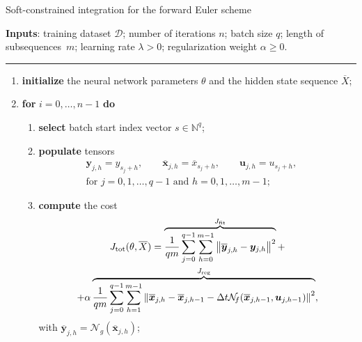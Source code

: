 \documentclass{article} %
\newcommand{\NN}{\mathcal{N}} %
\newcommand{\batchsize}{q}
\newcommand{\seqlen}{m}
\newcommand{\numiter}{n}
\newcommand{\tens}[1]{\bm{#1}}
\newcommand{\Yid}{Y}
\newcommand{\Did}{{\mathcal{D}}}
\newcommand{\hidden}[1]{\overline{#1}}
\newcommand{\norm}[1]{\left\lVert#1\right\rVert}
\renewcommand{\theenumi}{\arabic{enumi}}
\renewcommand{\theenumii}{\arabic{enumii}}
\begin{document}
\begin{algorithm}%
	\caption{Soft-constrained integration  for the forward Euler scheme}
	\label{algo:minibatch_consistency_method}
\small
	\textbf{Inputs}: training dataset $\Did$; number of iterations $n$; batch size $\batchsize$; length of subsequences~$\seqlen$; learning rate $\lambda>0$;  regularization weight $\alpha \geq 0$.
\vspace*{-.0cm}\hrule\vspace*{.0cm}
	\begin{enumerate}[label=\arabic*., ref=\theenumi{}]
        \item  \textbf{initialize} the neural network parameters $\theta$    and the hidden state sequence $\hidden{X}$; %
		\item  \textbf{for} $i=0,\ldots,\numiter-1$ \textbf{do}
		\begin{enumerate}[label=\theenumi{}.\arabic*., ref=\theenumi{}.\theenumii{}]
			\item \textbf{select} batch start index  vector $s \in \mathbb{N}^q$;
			\item \textbf{populate} tensors
			\begin{align*}
			& {{\tens{y}}}_{j,h}=y_{s_j+h}, \qquad
			 \hidden{{\tens{x}}}_{j,h}=\hidden{x}_{s_j+h}, \qquad
			 {{\tens{u}}}_{j,h}=u_{s_j+h}, \qquad \\
			 & \textrm{for  } j\!=\!0,1,\dots,\batchsize\!-\!1 \textrm{\ \ and\ \ } h\!=\!0,1,\dots,\seqlen\!-\!1;
			\end{align*}			
			\item \textbf{compute} the cost 
\begin{multline*}
J_{\rm tot}(\theta,\hidden{X}) = 
\overbrace{\frac{1}{\batchsize \seqlen}\sum_{j=0}^{\batchsize-1}\sum_{h=0}^{\seqlen-1} \norm{{\hidden{\tens{y}}}_{j,h} - {{\tens{y}}}_{j,h}}^2}^{J_{\rm fit}}  + \\
+\alpha \overbrace{\frac{1}{\batchsize \seqlen} \sum_{j=0}^{\batchsize-1}\sum_{h=1}^{\seqlen-1} \norm{ \hidden{\tens{x}}_{j,h} -
\hidden{\tens{x}}_{j,h-1} - \Delta t \NN_{\!f}(\hidden{\tens{x}}_{j,h-1}, \tens{u}_{j,h-1})}^2}^{J_{\rm reg}},
\end{multline*}
with $\hidden{\tens{y}}_{j,h} = \NN_{\!g}(\hidden{\tens{x}}_{j,h})$;


\end{enumerate}
\end{enumerate}
\end{algorithm}
\end{document}
